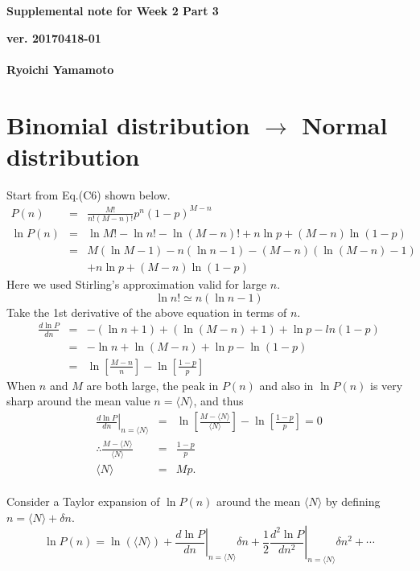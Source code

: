 \documentclass[a4paper,11pt]{article}
\begin{document}
\begin{center}
  {\LARGE\bf Supplemental note for Week 2 Part 3}
  \end{center}
\begin{flushright}
  {\large\bf ver. 20170418-01}\\
 \ \\
{\large\bf Ryoichi Yamamoto}\\
\end{flushright}
\section{Binomial distribution $\rightarrow$ Normal distribution}

Start from Eq.(C6) shown below.
\begin{eqnarray}
  P(n)&=&\frac{M!}{n!(M-n)!}p^n(1-p)^{M-n}\\
  \ln P(n)&=&\ln M! -\ln n! - \ln (M-n)!+n\ln p +(M-n)\ln(1-p)\\
  &=&M(\ln M -1) -n(\ln n -1) - (M-n)(\ln (M-n)-1)\\& & + n\ln p +(M-n)\ln (1-p)
\end{eqnarray}
Here we used Stirling's approximation  valid for large $n$.
\begin{equation}
\ln n!\simeq n(\ln n -1)
\end{equation}
Take the 1st derivative of the above equation in terms of $n$.
\begin{eqnarray}
  \frac{d \ln P}{dn}&=&-(\ln n +1) + (\ln(M-n)+1) + \ln p -ln(1-p)\\
  &=&-\ln n + \ln(M-n)+\ln p -\ln(1-p)\\
  &=&\ln \left[\frac{M-n}{n} \right] - \ln \left[\frac{1-p}{p} \right] 
\end{eqnarray}
When $n$ and $M$ are both large, the peak in $P(n)$ and also in $\ln P(n)$ is very sharp around the mean value $n=\langle N\rangle$, and thus
\begin{eqnarray}
  \left.\frac{d \ln P}{dn}\right|_{n=\langle N\rangle} &=&\ln \left[\frac{M-\langle N\rangle}{\langle N\rangle} \right] - \ln \left[\frac{1-p}{p} \right] =0\\
  \therefore \frac{M-\langle N\rangle}{\langle N\rangle} &=& \frac{1-p}{p} \\
  \langle N\rangle&=&Mp.
\end{eqnarray}
\\
Consider a Taylor expansion of $\ln P(n)$ around the mean $\langle N\rangle$ by defining $n=\langle N\rangle+\delta n$.
\begin{equation}
  \ln P(n) = \ln (\langle N\rangle) + \left.\frac{d \ln P}{dn}\right|_{n=\langle N\rangle}\delta n
  + \frac{1}{2}\left.\frac{d^2 \ln P}{dn^2}\right|_{n=\langle N\rangle}\delta n^2 + \cdots
  \end{equation}
\end{document}
